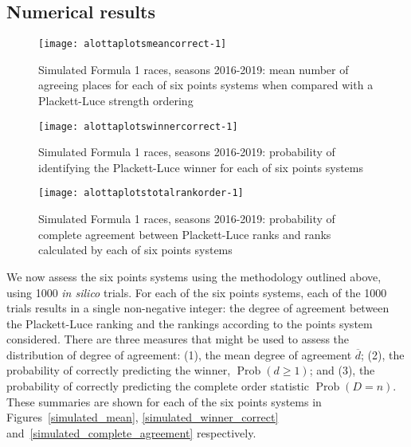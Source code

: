 \documentclass[a4,12pt]{article}
\begin{document}
\subsection{Numerical results}\label{numerical-results}

\begin{figure}
{\centering \texttt{[image: alottaplotsmeancorrect-1]}}
\caption[\doublespacing Simulated Formula 1 races, seasons
  2016-2019]{\doublespacing Simulated Formula 1 races, seasons
  2016-2019: mean number of agreeing places for each of six
  points \label{simulated_mean} systems when compared with a
  Plackett-Luce strength ordering}\label{fig:alottaplotsmeancorrect}
\end{figure}

\begin{figure}
{\centering \texttt{[image: alottaplotswinnercorrect-1]} }
\caption[\doublespacing Simulated Formula 1 races, seasons
  2016-2019]{\doublespacing Simulated Formula 1 races, seasons
  2016-2019: probability of identifying the Plackett-Luce winner for
  each of six points \label{simulated_winner_correct}
  systems}\label{fig:alottaplotswinnercorrect}
\end{figure}

\begin{figure}
{\centering \texttt{[image: alottaplotstotalrankorder-1]}}
\caption[\doublespacing Simulated Formula 1 races, seasons
  2016-2019]{\doublespacing Simulated Formula 1 races, seasons
  2016-2019: probability of complete agreement between Plackett-Luce
  ranks and ranks calculated by each of six
  points \label{simulated_complete_agreement}
  systems}\label{fig:alottaplotstotalrankorder}
\end{figure}

We now assess the six points systems using the methodology outlined
above, using 1000 \emph{in silico} trials.  For each of the six points
systems, each of the 1000 trials results in a single non-negative
integer: the degree of agreement between the Plackett-Luce ranking and
the rankings according to the points system considered.  There are
three measures that might be used to assess the distribution of degree
of agreement: (1), the mean degree of agreement \(\overline{d}\); (2),
the probability of correctly predicting the winner,
$\operatorname{Prob}(d\geq 1)$; and (3), the probability of correctly
predicting the complete order statistic $\operatorname{Prob}(D=n)$.
These summaries are shown for each of the six points systems in
Figures~\ref{simulated_mean}, \ref{simulated_winner_correct}
and~\ref{simulated_complete_agreement} respectively.
\end{document}
